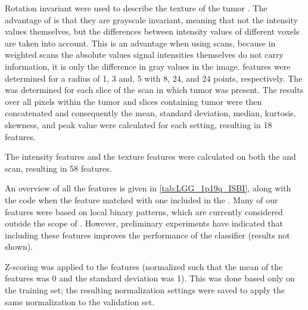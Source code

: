 \begin{subappendices}
Rotation invariant  were used to describe the texture of the \gls{tumor} \autocite{ojala2002multiresolution}.
The advantage of  is that they are grayscale invariant, meaning that not the intensity values themselves, but the differences between intensity values of different voxels are taken into account.
This is an advantage when using  scans, because in weighted  scans the absolute values signal intensities themselves do not carry information, it is only the difference in gray values in the image.
 features were determined for a radius of 1, 3 and, 5 with 8, 24, and 24 points, respectively.
The  was determined for each slice of the  scan in which \gls{tumor} was present.
The results over all pixels within the \gls{tumor} and slices containing \gls{tumor} were then concatenated and consequently the mean, standard deviation, median, kurtosis, skewness, and peak value were calculated for each setting, resulting in 18  features.

The intensity features and the texture features were calculated on both the  and  scan, resulting in 58 features.

An overview of all the features is given in \cref{tab:LGG_1p19q_ISBI}, along with the  code when the feature matched with one included in the  \autocite{zwanenburg2016image}.
Many of our features were based on local binary patterns, which are currently considered outside the scope of .
However, preliminary experiments have indicated that including these features improves the performance of the classifier (results not shown).

Z-scoring was applied to the features (normalized such that the mean of the features was 0 and the standard deviation was 1).
This was done based only on the training set; the resulting normalization settings were saved to apply the same normalization to the validation set.


\end{subappendices}
